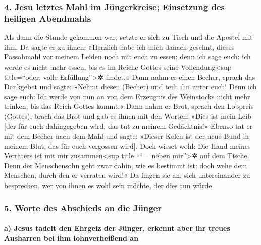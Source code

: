\hypertarget{jesu-letztes-mahl-im-juxfcngerkreise-einsetzung-des-heiligen-abendmahls}{%
\subsubsection{4. Jesu letztes Mahl im Jüngerkreise; Einsetzung des
heiligen
Abendmahls}\label{jesu-letztes-mahl-im-juxfcngerkreise-einsetzung-des-heiligen-abendmahls}}

 Als dann die Stunde gekommen war, setzte er sich zu
Tisch und die Apostel mit ihm.  Da sagte er zu ihnen:
»Herzlich habe ich mich danach gesehnt, dieses Passahmahl vor meinem
Leiden noch mit euch zu essen;  denn ich sage euch: ich
werde es nicht mehr essen, bis es im Reiche Gottes seine
Vollendung\textless sup title=``oder: volle Erfüllung''\textgreater✲
findet.«  Dann nahm er einen Becher, sprach das Dankgebet
und sagte: »Nehmt diesen (Becher) und teilt ihn unter euch!
 Denn ich sage euch: Ich werde von nun an von dem
Erzeugnis des Weinstocks nicht mehr trinken, bis das Reich Gottes
kommt.«  Dann nahm er Brot, sprach den Lobpreis (Gottes),
brach das Brot und gab es ihnen mit den Worten: »Dies ist mein Leib
{[}der für euch dahingegeben wird; das tut zu meinem Gedächtnis!«
 Ebenso tat er mit dem Becher nach dem Mahl und sagte:
»Dieser Kelch ist der neue Bund in meinem Blut, das für euch vergossen
wird{]}.  Doch wisset wohl: Die Hand meines Verräters ist
mit mir zusammen\textless sup title=``=~neben mir''\textgreater✲ auf dem
Tische.  Denn der Menschensohn geht zwar dahin, wie es
bestimmt ist; doch wehe dem Menschen, durch den er verraten wird!«
 Da fingen sie an, sich untereinander zu besprechen, wer
von ihnen es wohl sein möchte, der dies tun würde.

\hypertarget{worte-des-abschieds-an-die-juxfcnger}{%
\subsubsection{5. Worte des Abschieds an die
Jünger}\label{worte-des-abschieds-an-die-juxfcnger}}

\hypertarget{a-jesus-tadelt-den-ehrgeiz-der-juxfcnger-erkennt-aber-ihr-treues-ausharren-bei-ihm-lohnverheiuxdfend-an}{%
\paragraph{a) Jesus tadelt den Ehrgeiz der Jünger, erkennt aber ihr
treues Ausharren bei ihm lohnverheißend
an}\label{a-jesus-tadelt-den-ehrgeiz-der-juxfcnger-erkennt-aber-ihr-treues-ausharren-bei-ihm-lohnverheiuxdfend-an}}

